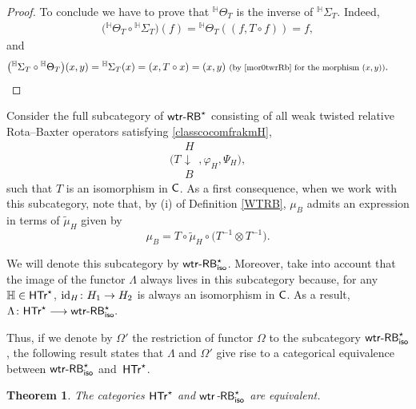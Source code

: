 \documentclass[10pt,a4paper]{amsart}
\numberwithin{equation}{section}
\newtheorem{Theorem}{Theorem}[section]
\begin{document}
\begin{proof}
To conclude we have to prove that ${}^{\mathbb{H}}\Theta_{T}$ is the inverse of ${}^{\mathbb{H}}\Sigma_{T}$. Indeed,
\begin{align*}
\bigl({}^{\mathbb{H}}\Theta_{T}\circ {}^{\mathbb{H}}\Sigma_{T}\bigr)(f)={}^{\mathbb{H}}\Theta_{T}((f, T\circ f))=f,
\end{align*}
and
\begin{align*}
\bigl({}^{\mathbb{H}}\Sigma_{T}\circ{}^{\mathbb{H}}\Theta_{T}\bigr)(x,y)={}^{\mathbb{H}}\Sigma_{T}(x)=(x,T\circ x)=(x,y)\ \text{\footnotesize\textnormal{(by \eqref{mor0twrRb} for the morphism $(x,y)$)}}.
\tag*{\qed}
\end{align*}
\renewcommand{\qed}{}
\end{proof}


Consider the full subcategory of ${\sf wtr}\textnormal{-}{\sf RB}^{\star}$ consisting of all weak twisted relative Rota--Baxter operators satisfying \eqref{classcocomfrakmH},
\[
\Biggl(T\begin{array}{c}H\\\downarrow\\B\end{array},\varphi_{H},\Psi_{H}\biggr),
\]
 such that $T$ is an isomorphism in ${\sf C}$. As a first consequence, when we work with this subcategory, note that, by (i) of Definition \ref{WTRB}, $\mu_{B}$ admits an expression in terms of $\widetilde{\mu}_{H}$ given by
\begin{equation*}%
\mu_{B}=T\circ \widetilde{\mu}_{H}\circ\bigl(T^{-1}\otimes T^{-1}\bigr).
\end{equation*}

We will denote this subcategory by ${\sf wtr}\textnormal{-}{\sf RB}^{\star}_{{\sf iso}}$. Moreover, take into account that the image of the functor $\Lambda$ always lives in this subcategory because, for any $\mathbb{H}\in {\sf HTr}^{\star}$, ${\rm id}_{H}\colon H_{1}\rightarrow H_{2}$ is always an isomorphism in ${\sf C}$. As a result,
$\Lambda\colon \sf{HTr}^{\star}\longrightarrow {\sf wtr}\textnormal{-}{\sf RB}^{\star}_{{\sf iso}}.$

Thus, if we denote by $\Omega'$ the restriction of functor $\Omega$ to the subcategory ${\sf wtr}\textnormal{-}{\sf RB}^{\star}_{{\sf iso}}$, the following result states that $\Lambda$ and $\Omega'$ give rise to a categorical equivalence between ${\sf wtr}\textnormal{-}{\sf RB}^{\star}_{{\sf iso}}$ and~${\sf HTr}^{\star}$.

\begin{Theorem}\label{catequivHTr}
The categories $\sf{HTr}^{\star}$ and ${\sf wtr}$-${\sf RB}^{\star}_{{\sf iso}}$ are equivalent.
\end{Theorem}
\end{document}
